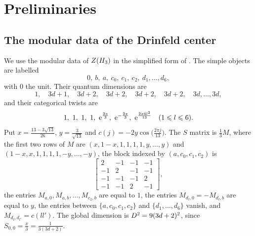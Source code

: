\documentclass[leqno]{article}
\let\cal\relax
\newcommand{\cal}{\mathcal}
\renewcommand{\leq}{\ensuremath{\leqslant}}
\let\i\relax
\newcommand{\i}{\mathrm{i}}
\newcommand{\e}{\mathrm{e}}
\numberwithin{equation}{section}
\begin{document}
\section{Preliminaries}
\label{sec:preliminaries}

\subsection{The modular data of the Drinfeld center}

We use the modular data of $Z(\cal H_3)$ in the simplified form of \cite[equations (2.5a) and (2.5b) p.~20]{EvG11}. The simple objects are labelled
\[
0,\ b,\ a,\ c_0,\ c_1,\ c_2,\ d_1,\ldots,d_6,
\]
with $0$ the unit. Their quantum dimensions are
\begin{equation}
\label{eq:center-dimensions}
1,\quad 3d+1,\quad 3d+2,\quad 3d+2,\quad 3d+2,\quad 3d+2,\quad 3d,\ldots,3d,
\end{equation}
and their categorical twists are
\begin{equation}
\label{eq:center-twists}
1,\ 1,\ 1,\ 1,\ \e^{\frac{2\pi\i}{3}},\ \e^{-\frac{2\pi\i}{3}},\ \e^{\frac{2\pi\i 6l^2}{13}}\quad (1 \leq l \leq 6).
\end{equation}
Put $x = \frac{13-3\sqrt{13}}{26}$, $y = \frac{3}{\sqrt{13}}$ and $c(j) = -2y\cos\big(\frac{2\pi j}{13}\big)$. The $S$ matrix is $\frac{1}{3}M$, where the first two rows of $M$ are $(x,1-x,1,1,1,1,y,\ldots,y)$ and $(1-x,x,1,1,1,1,-y,\ldots,-y)$, the block indexed by $(a,c_0,c_1,c_2)$ is
\[
\begin{bmatrix}
2&-1&-1&-1\\
-1&2&-1&-1\\
-1&-1&-1&2\\
-1&-1&2&-1
\end{bmatrix},
\]
the entries $M_{a,0}, M_{a,b}, \ldots, M_{c_2,b}$ are equal to $1$, the entries $M_{d_l,0} = -M_{d_l,b}$ are equal to $y$, the entries between $\{a,c_0,c_1,c_2\}$ and $\{d_1,\ldots,d_6\}$ vanish, and $M_{d_l,d_{l'}} = c(ll')$. The global dimension is $\cal D^2 = 9(3d+2)^2$, since $S_{0,0} = \frac{x}{3} = \frac{1}{3(3d+2)}$.
\end{document}
